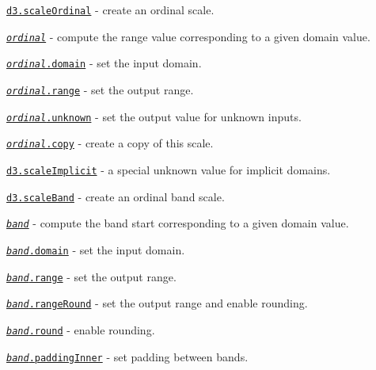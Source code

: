 \begin{DoxyItemize}
\item \href{https://github.com/d3/d3-scale/blob/master/README.md#scaleOrdinal}{\tt d3.\+scale\+Ordinal} -\/ create an ordinal scale.
\item \href{https://github.com/d3/d3-scale/blob/master/README.md#_ordinal}{\tt {\itshape ordinal}} -\/ compute the range value corresponding to a given domain value.
\item \href{https://github.com/d3/d3-scale/blob/master/README.md#ordinal_domain}{\tt {\itshape ordinal}.domain} -\/ set the input domain.
\item \href{https://github.com/d3/d3-scale/blob/master/README.md#ordinal_range}{\tt {\itshape ordinal}.range} -\/ set the output range.
\item \href{https://github.com/d3/d3-scale/blob/master/README.md#ordinal_unknown}{\tt {\itshape ordinal}.unknown} -\/ set the output value for unknown inputs.
\item \href{https://github.com/d3/d3-scale/blob/master/README.md#ordinal_copy}{\tt {\itshape ordinal}.copy} -\/ create a copy of this scale.
\item \href{https://github.com/d3/d3-scale/blob/master/README.md#scaleImplicit}{\tt d3.\+scale\+Implicit} -\/ a special unknown value for implicit domains.
\item \href{https://github.com/d3/d3-scale/blob/master/README.md#scaleBand}{\tt d3.\+scale\+Band} -\/ create an ordinal band scale.
\item \href{https://github.com/d3/d3-scale/blob/master/README.md#_band}{\tt {\itshape band}} -\/ compute the band start corresponding to a given domain value.
\item \href{https://github.com/d3/d3-scale/blob/master/README.md#band_domain}{\tt {\itshape band}.domain} -\/ set the input domain.
\item \href{https://github.com/d3/d3-scale/blob/master/README.md#band_range}{\tt {\itshape band}.range} -\/ set the output range.
\item \href{https://github.com/d3/d3-scale/blob/master/README.md#band_rangeRound}{\tt {\itshape band}.range\+Round} -\/ set the output range and enable rounding.
\item \href{https://github.com/d3/d3-scale/blob/master/README.md#band_round}{\tt {\itshape band}.round} -\/ enable rounding.
\item \href{https://github.com/d3/d3-scale/blob/master/README.md#band_paddingInner}{\tt {\itshape band}.padding\+Inner} -\/ set padding between bands.

\end{DoxyItemize}
